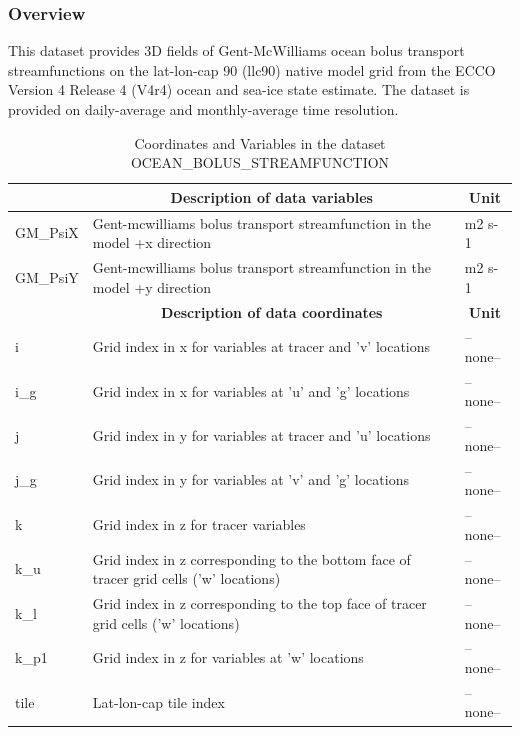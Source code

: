 \subsubsection{Overview}
This dataset provides 3D fields of Gent-McWilliams ocean bolus transport streamfunctions on the lat-lon-cap 90 (llc90) native model grid from the ECCO Version 4 Release 4 (V4r4) ocean and sea-ice state estimate. The dataset is provided on daily-average and monthly-average time resolution. 
\begin{longtable}{|m{}|m{}|m{}|}
\caption{Coordinates and Variables in the dataset OCEAN\_BOLUS\_STREAMFUNCTION}
\label{tab:table-OCEAN_BOLUS_STREAMFUNCTION-fields} \\ 
\hline \endhead \hline \endfoot
\rowcolor{lightgray} \multicolumn{1}{|c|}{\textbf{Variables}} & \multicolumn{1}{|c|}{\textbf{Description of data variables}} &  \multicolumn{1}{|c|}{\textbf{Unit}}\\ \hline
GM\_PsiX &Gent-mcwilliams bolus transport streamfunction in the model +x direction &m2 s-1  \\ \hline
GM\_PsiY &Gent-mcwilliams bolus transport streamfunction in the model +y direction &m2 s-1  \\ \hline
\rowcolor{lightgray} \multicolumn{1}{|c|}{\textbf{Coordinates}} & \multicolumn{1}{|c|}{\textbf{Description of data coordinates}} &  \multicolumn{1}{|c|}{\textbf{Unit}}\\ \hline
i &Grid index in x for variables at tracer and 'v' locations &--none--  \\ \hline
i\_g &Grid index in x for variables at 'u' and 'g' locations &--none--  \\ \hline
j &Grid index in y for variables at tracer and 'u' locations &--none--  \\ \hline
j\_g &Grid index in y for variables at 'v' and 'g' locations &--none--  \\ \hline
k &Grid index in z for tracer variables &--none--  \\ \hline
k\_u &Grid index in z corresponding to the bottom face of tracer grid cells ('w' locations) &--none--  \\ \hline
k\_l &Grid index in z corresponding to the top face of tracer grid cells ('w' locations) &--none--  \\ \hline
k\_p1 &Grid index in z for variables at 'w' locations &--none--  \\ \hline
tile &Lat-lon-cap tile index &--none--  \\ \hline

\end{longtable}
